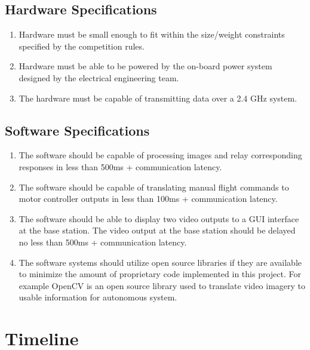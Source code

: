 \documentclass[onecolumn, draftclsnofoot,10pt, compsoc]{IEEEtran}
\begin{document}
\subsection{Hardware Specifications}
\begin{enumerate}
\item Hardware must be small enough to fit within the size/weight constraints specified by the competition rules. 
\item Hardware must be able to be powered by the on-board power system designed by the electrical engineering team. 
\item The hardware must be capable of transmitting data over a 2.4 GHz system. 


\end{enumerate}
\subsection{Software Specifications}
\begin{enumerate}
\item The software should be capable of processing images and relay corresponding responses in less than 500ms + communication latency.

\item The software should be capable of translating manual flight commands to motor controller outputs in less than 100ms + communication latency.

\item The software should be able to display two video outputs to a GUI interface at the base station. The video output at the base station should be delayed no less than 500ms + communication latency. 

\item The software systems should utilize open source libraries if they are available to minimize the amount of proprietary code implemented in this project. For example OpenCV is an open source library used to translate video imagery to usable information for autonomous system.


\end{enumerate}






\newpage

\section{Timeline}
\end{document}
